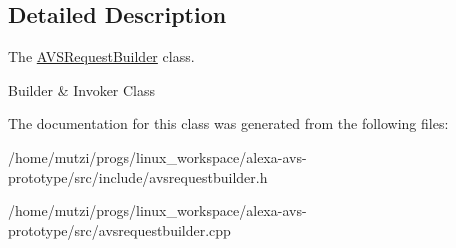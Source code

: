 \subsection{Detailed Description}
The \hyperlink{classAVSRequestBuilder}{A\+V\+S\+Request\+Builder} class. 

Builder \& Invoker Class 

The documentation for this class was generated from the following files\+:\begin{DoxyCompactItemize}
\item 
/home/mutzi/progs/linux\+\_\+workspace/alexa-\/avs-\/prototype/src/include/avsrequestbuilder.\+h\item 
/home/mutzi/progs/linux\+\_\+workspace/alexa-\/avs-\/prototype/src/avsrequestbuilder.\+cpp\end{DoxyCompactItemize}
